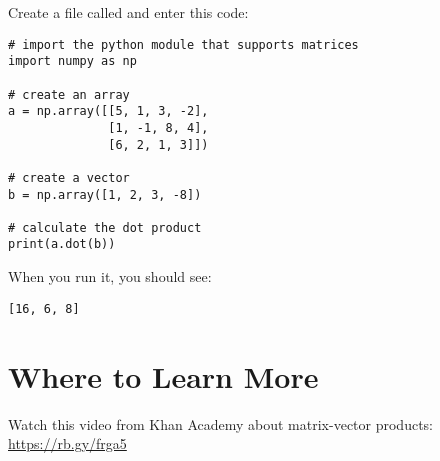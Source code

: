 Create a file called  and enter this code:

\begin{Verbatim}
# import the python module that supports matrices
import numpy as np

# create an array
a = np.array([[5, 1, 3, -2], 
              [1, -1, 8, 4], 
              [6, 2, 1, 3]])

# create a vector 
b = np.array([1, 2, 3, -8])

# calculate the dot product
print(a.dot(b))
\end{Verbatim}

When you run it, you should see:
\begin{Verbatim}
[16, 6, 8]
\end{Verbatim}

\section{Where to Learn More}
Watch this video from Khan Academy about matrix-vector products: \url{https://rb.gy/frga5}

